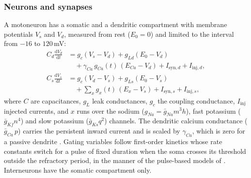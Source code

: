 \documentclass[pdflatex,sn-apa,iicol]{sn-jnl}
\providecommand{\dd}{\mathrm{d}}
\begin{document}
\subsubsection{Neurons and synapses}\label{sec:neurons}

A motoneuron has a somatic and a dendritic compartment with membrane potentials $V_s$ and $V_d$, measured from rest ($E_0 = 0$) and limited to the interval from $-16$ to $120$\,mV:
\begin{align}
C_d \frac{\dd V_d}{\dd t} &= g_c (V_s - V_d) + g_{Ld} (E_0 - V_d) \nonumber\\
 &\quad + \gamma_{Ca}\, g_{Ca}(t)\,(E_{Ca} - V_d) + I_{\mathrm{syn},d} + I_{\mathrm{inj},d}, \label{eq:dend}\\
C_s \frac{\dd V_s}{\dd t} &= g_c (V_d - V_s) + g_{Ls} (E_0 - V_s) \nonumber\\
 &\quad + \sum_{x} g_x(t)\,(E_x - V_s) + I_{\mathrm{syn},s} + I_{\mathrm{inj},s}, \label{eq:soma}
\end{align}
where $C$ are capacitances, $g_L$ leak conductances, $g_c$ the coupling conductance, $I_{\mathrm{inj}}$ injected currents, and $x$ runs over the sodium ($g_{Na} = \bar g_{Na} m^3 h$), fast potassium ($\bar g_{Kf} n^4$) and slow potassium ($\bar g_{Ks} q^2$) channels. The dendritic calcium conductance ($\bar g_{Ca}\, p$) carries the persistent inward current and is scaled by $\gamma_{Ca}$, which is zero for a passive dendrite \citep{Elias2012}. Gating variables follow first-order kinetics whose rate constants switch for a pulse of fixed duration when the soma crosses its threshold outside the refractory period, in the manner of the pulse-based models of \citet{Destexhe1997}.
Interneurons have the somatic compartment only.
\end{document}
